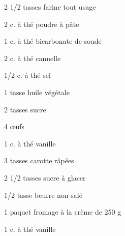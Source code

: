 %
%   
%   
%   
%




\totaltime{}


\begin{ingredients}
    \item[] 
    \item 2 1/2 tasses farine tout usage
    \item 2 c. à thé poudre à pâte
    \item 1 c. à thé bicarbonate de soude
    \item 2 c. à thé cannelle
    \item 1/2 c. à thé sel
    \item 1 tasse huile végétale
    \item 2 tasses sucre
    \item 4 œufs
    \item 1 c. à thé vanille
    \item 3 tasses carotte râpées
    \\
    \item[] 
    \item 2 1/2 tasses sucre à glacer
    \item 1/2 tasse beurre non salé
    \item 1 paquet fromage à la crème de 250 g
    \item 1 c. à thé vanille
\end{ingredients}

